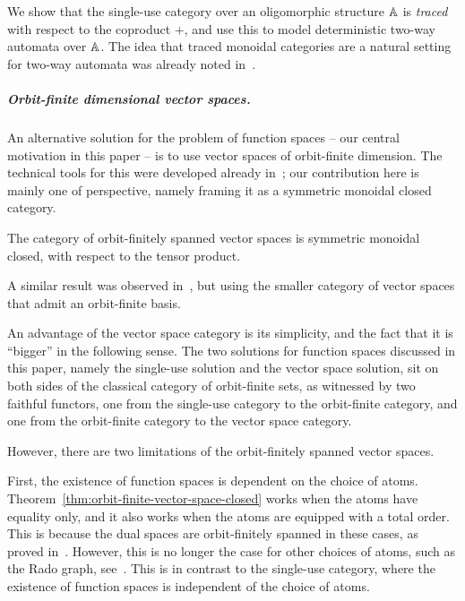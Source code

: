 \documentclass[a4paper,UKenglish,cleveref, autoref, numberwithinsect, thm-restate]{lipics-v2021}
\begin{document}
We show that the single-use category over an oligomorphic structure $\mathbb A$ is \emph{traced} with respect to the coproduct $+$, and use this to model deterministic two-way automata over $\mathbb A$. The idea that traced monoidal categories are a natural setting for two-way automata was already noted in~\cite{hines2003categorical}.

\subparagraph{Orbit-finite dimensional vector spaces.}

An alternative solution for the problem of function spaces -- our central motivation in this paper -- is to use vector spaces of orbit-finite dimension. The technical tools for this were developed already in~\cite{bojanczykKM21OrbitFiniteVector}; our contribution here is mainly one of perspective, namely framing it as a symmetric monoidal closed category.
\begin{theorem}\label{thm:orbit-finite-vector-space-closed} The category of orbit-finitely spanned vector spaces is symmetric monoidal closed, with respect to the tensor product.
\end{theorem}
\begin{remark}
    A similar result was observed in~\cite[Theorem 3.8]{przybylek2024note}, but using the smaller category of vector spaces that admit an orbit-finite basis.   
\end{remark}
An advantage of the vector space category is its simplicity, and the fact that it is ``bigger'' in the following sense. The two solutions for function spaces discussed in this paper, namely the single-use solution and the vector space solution, sit on both sides of the classical category of orbit-finite sets, as witnessed by two faithful functors, one from the single-use category to the orbit-finite category, and one from the orbit-finite category to the vector space category. 

However, there are two limitations of the orbit-finitely spanned vector spaces. 

First, the existence of function spaces is dependent on the choice of atoms. Theorem~\ref{thm:orbit-finite-vector-space-closed}  works when the atoms have equality only, and it also works when the atoms are equipped with a total order. This is because the dual spaces are orbit-finitely spanned in these cases, as proved in~\cite[Corollary VI.5]{bojanczykKM21OrbitFiniteVector}. However, this is no longer the case for other choices of  atoms, such as the Rado graph, see~\cite[Example 9]{bojanczykKM21OrbitFiniteVector}. This is in contrast to the single-use category, where the existence of function spaces is independent of the choice of atoms. 
\end{document}

